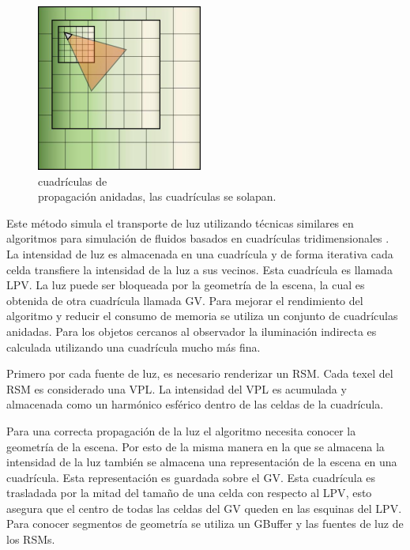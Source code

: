 \begin{figure}
	\centering
	\includegraphics[width=0.90\linewidth]{media/g4957.png}
	\caption{cuadrículas de \\ propagación anidadas, las cuadrículas se solapan.}
	\label{fig:nested_lpv}
\end{figure}
Este método simula el transporte de luz utilizando técnicas similares en algoritmos para simulación de fluidos basados en cuadrículas tridimensionales \cite{Crane07}. La intensidad de luz es almacenada en una cuadrícula y de forma iterativa cada celda transfiere la intensidad de la luz a sus vecinos. Esta cuadrícula es llamada \ac{LPV}. La luz puede ser bloqueada por la geometría de la escena, la cual es obtenida de otra cuadrícula llamada \ac{GV}. Para mejorar el rendimiento del algoritmo y reducir el consumo de memoria se utiliza un conjunto de cuadrículas anidadas. Para los objetos cercanos al observador la iluminación indirecta es calculada utilizando una cuadrícula mucho más fina.

Primero por cada fuente de luz, es necesario renderizar un \ac{RSM}. Cada texel del \ac{RSM} es considerado una \ac{VPL}. La intensidad del \ac{VPL} es acumulada y almacenada como un harmónico esférico dentro de las celdas de la cuadrícula.

Para una correcta propagación de la luz el algoritmo necesita conocer la geometría de la escena. Por esto de la misma manera en la que se almacena la intensidad de la luz también se almacena una representación de la escena en una cuadrícula. Esta representación es guardada sobre el \ac{GV}. Esta cuadrícula es trasladada por la mitad del tamaño de una celda con respecto al \ac{LPV}, esto asegura que el centro de todas las celdas del \ac{GV} queden en las esquinas del \ac{LPV}. Para conocer segmentos de geometría se utiliza un \ac{GBuffer} y las fuentes de luz de los \ac{RSM}s.


